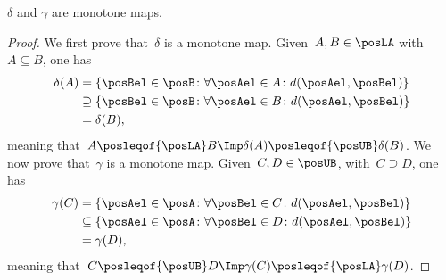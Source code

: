 \begin{lemma}
    \label{lem:deltagammamonotone}
    $\delta$ and $\gamma$ are monotone maps.
\end{lemma}
\begin{proof}
    We first prove that~$\delta$ is a monotone map.
    Given~$A,B\in \posLA$ with~$A\subseteq B$, one has
    \begin{equation}
        \begin{aligned}
            \delta(A) & =\{\posBel\in \posB\colon \forall \posAel \in A\colon d(\posAel,\posBel)\}          \\
                      & \supseteq \{\posBel\in \posB\colon \forall \posAel\in B \colon d(\posAel,\posBel)\} \\
                      & =\delta(B),
        \end{aligned}
    \end{equation}
    meaning that~$A\posleqof{\posLA} B \Imp \delta(A)\posleqof{\posUB} \delta(B)$.
    We now prove that~$\gamma$ is a monotone map.
    Given~$C,D\in \posUB$, with~$C\supseteq D$, one has
    \begin{equation}
        \begin{aligned}
            \gamma(C) & =\{\posAel\in \posA\colon \forall \posBel \in C\colon d(\posAel,\posBel)\}           \\
                      & \subseteq \{\posAel\in \posA\colon \forall \posBel \in D \colon d(\posAel,\posBel)\} \\
                      & =\gamma(D),
        \end{aligned}
    \end{equation}
    meaning that~$C\posleqof{\posUB} D \Imp \gamma(C)\posleqof{\posLA} \gamma(D)$.
\end{proof}

